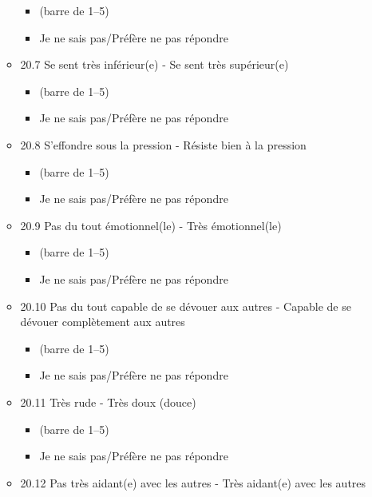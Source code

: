 \documentclass[
  letterpaper,
  DIV=11,
  numbers=noendperiod]{scrreprt}
\providecommand{\tightlist}{%
  \setlength{\itemsep}{0pt}\setlength{\parskip}{0pt}}\usepackage{longtable,booktabs,array}
\begin{document}
\begin{enumerate}
\begin{itemize}
    \begin{itemize}
    \tightlist
    \item
      (barre de 1--5)
    \item
      Je ne sais pas/Préfère ne pas répondre
    \end{itemize}
  \item
    20.7 Se sent très inférieur(e) - Se sent très supérieur(e)

    \begin{itemize}
    \tightlist
    \item
      (barre de 1--5)
    \item
      Je ne sais pas/Préfère ne pas répondre
    \end{itemize}
  \item
    20.8 S'effondre sous la pression - Résiste bien à la pression

    \begin{itemize}
    \tightlist
    \item
      (barre de 1--5)
    \item
      Je ne sais pas/Préfère ne pas répondre
    \end{itemize}
  \item
    20.9 Pas du tout émotionnel(le) - Très émotionnel(le)

    \begin{itemize}
    \tightlist
    \item
      (barre de 1--5)
    \item
      Je ne sais pas/Préfère ne pas répondre
    \end{itemize}
  \item
    20.10 Pas du tout capable de se dévouer aux autres - Capable de se
    dévouer complètement aux autres

    \begin{itemize}
    \tightlist
    \item
      (barre de 1--5)
    \item
      Je ne sais pas/Préfère ne pas répondre
    \end{itemize}
  \item
    20.11 Très rude - Très doux (douce)

    \begin{itemize}
    \tightlist
    \item
      (barre de 1--5)
    \item
      Je ne sais pas/Préfère ne pas répondre
    \end{itemize}
  \item
    20.12 Pas très aidant(e) avec les autres - Très aidant(e) avec les
    autres


\end{itemize}
\end{enumerate}
\end{document}
